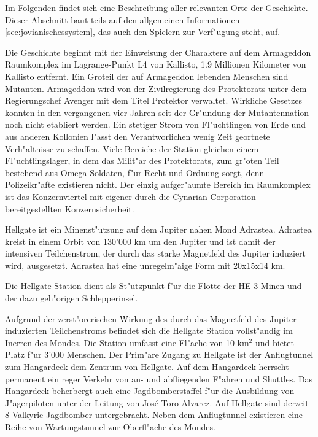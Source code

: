 

Im Folgenden findet sich eine Beschreibung aller relevanten Orte der Geschichte. Dieser Abschnitt baut teils auf den allgemeinen Informationen \cref{sec:jovianischessystem}, das auch den Spielern zur Verf"ugung steht, auf.


Die Geschichte beginnt mit der Einweisung der Charaktere auf dem Armageddon Raumkomplex im Lagrange-Punkt L4 von Kallisto, 1.9 Millionen Kilometer von Kallisto entfernt. Ein Gro\3teil der auf Armageddon lebenden Menschen sind Mutanten. Armageddon wird von der Zivilregierung
des Protektorats unter dem Regierungschef Avenger mit dem Titel Protektor verwaltet. Wirkliche Gesetzes konnten in den vergangenen vier Jahren seit der Gr"undung der Mutantennation noch nicht etabliert werden. Ein stetiger Strom von Fl"uchtlingen von Erde und aus anderen Kollonien l"asst den Verantworlichen wenig Zeit geortnete Verh"altnisse zu schaffen. Viele Bereiche der Station gleichen einem Fl"uchtlingslager, in dem das Milit"ar des Protektorats, zum gr"o\3ten Teil bestehend aus Omega-Soldaten, f"ur Recht und Ordnung sorgt, denn Polizeikr"afte existieren nicht. Der einzig aufger"aumte Bereich im Raumkomplex ist das Konzernviertel mit eigener durch die Cynarian Corporation bereitgestellten Konzernsicherheit.


Hellgate ist ein Minenst"utzung auf dem Jupiter nahen Mond Adrastea. Adrastea kreist in einem Orbit von 130'000 km um den Jupiter und
ist damit der intensiven Teilchenstrom, der durch das starke Magnetfeld des Jupiter induziert wird, ausgesetzt. Adrastea hat eine unregelm"a\3ige Form mit 20x15x14 km.

Die Hellgate Station dient als St"utzpunkt f"ur die Flotte der HE-3 Minen und der dazu geh"origen Schlepperinsel. 

Aufgrund der zerst"orerischen Wirkung des durch das Magnetfeld des Jupiter induzierten Teilchenstroms befindet sich die Hellgate Station vollst"andig im Inerren des Mondes. Die Station umfasst eine Fl"ache von 10 km$^{2}$ und bietet Platz f"ur 3'000 Menschen. Der Prim"are Zugang zu Hellgate ist der Anflugtunnel zum Hangardeck dem Zentrum von Hellgate. Auf dem Hangardeck herrscht permanent ein reger Verkehr von an- und abfliegenden F"ahren und Shuttles. Das Hangardeck beherbergt auch eine Jagdbomberstaffel f"ur die Ausbildung von J"agerpiloten unter der Leitung von Jos\'{e} \frqq{}Toro\flqq{} Alvarez. Auf Hellgate sind derzeit 8 Valkyrie Jagdbomber untergebracht. Neben dem Anflugtunnel existieren eine Reihe von Wartungstunnel zur Oberfl"ache des Mondes.


